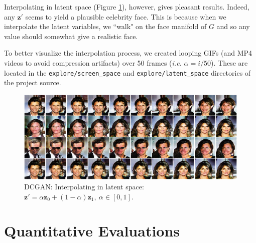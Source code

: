 \documentclass[table]{article}
\def\*#1{\mathbf{#1}}
\newcommand{\code}[1]{{\color{Blue}\small\texttt{#1}}}
\begin{document}
Interpolating in latent space (Figure \ref{latent_lerp}), however, gives pleasant results. Indeed, any $\*z'$ seems to yield a plausible celebrity face. This is because when we interpolate the latent variables, we ``walk" on the face manifold of $G$ and so any value should somewhat give a realistic face.

To better visualize the interpolation process, we created looping GIFs (and MP4 videos to avoid compression artifacts) over 50 frames (\textit{i.e.} $\alpha = i/50$). These are located in the \code{explore/screen\_space} and \code{explore/latent\_space} directories of the project source.


\begin{figure}[ht]
  \centering
  \includegraphics[width=\textwidth]{imgs/gan_latent_lerp}
  \caption{DCGAN: Interpolating in latent space: $\*z' = \alpha \*z_0 + (1-\alpha)\*z_1, \ \alpha \in [0,1]$.}
  \label{latent_lerp}
\end{figure}

\section{Quantitative Evaluations}
\end{document}
